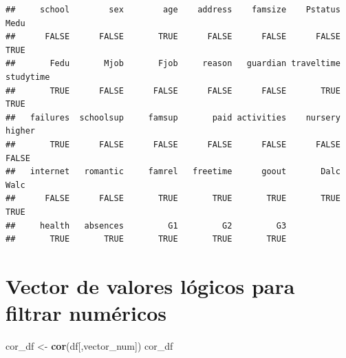 \documentclass[
]{article}
\newenvironment{Shaded}{\begin{snugshade}}{\end{snugshade}}
\newcommand{\KeywordTok}[1]{\textcolor[rgb]{0.13,0.29,0.53}{\textbf{#1}}}
\newcommand{\NormalTok}[1]{#1}
\newcommand{\StringTok}[1]{\textcolor[rgb]{0.31,0.60,0.02}{#1}}
\begin{document}
\begin{verbatim}
##     school        sex        age    address    famsize    Pstatus       Medu 
##      FALSE      FALSE       TRUE      FALSE      FALSE      FALSE       TRUE 
##       Fedu       Mjob       Fjob     reason   guardian traveltime  studytime 
##       TRUE      FALSE      FALSE      FALSE      FALSE       TRUE       TRUE 
##   failures  schoolsup     famsup       paid activities    nursery     higher 
##       TRUE      FALSE      FALSE      FALSE      FALSE      FALSE      FALSE 
##   internet   romantic     famrel   freetime      goout       Dalc       Walc 
##      FALSE      FALSE       TRUE       TRUE       TRUE       TRUE       TRUE 
##     health   absences         G1         G2         G3 
##       TRUE       TRUE       TRUE       TRUE       TRUE
\end{verbatim}

\hypertarget{vector-de-valores-luxf3gicos-para-filtrar-numuxe9ricos}{%
\section{Vector de valores lógicos para filtrar
numéricos}\label{vector-de-valores-luxf3gicos-para-filtrar-numuxe9ricos}}

\begin{Shaded}
\begin{Highlighting}[]
\NormalTok{cor_df <-}\StringTok{ }\KeywordTok{cor}\NormalTok{(df[,vector_num])}
\NormalTok{cor_df}
\end{Highlighting}
\end{Shaded}
\end{document}
